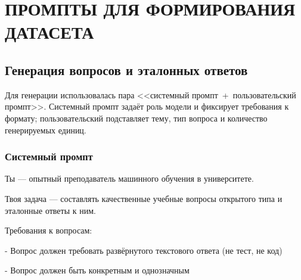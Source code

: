 \chapter{ПРОМПТЫ ДЛЯ ФОРМИРОВАНИЯ ДАТАСЕТА}
\label{app:prompts}
 
 
 
\section{Генерация вопросов и эталонных ответов}
\label{app:prompts:generation}
 
Для генерации использовалась пара <<системный промпт~+~пользовательский
промпт>>. Системный промпт задаёт роль модели и фиксирует требования к
формату; пользовательский подставляет тему, тип вопроса и количество
генерируемых единиц.
 
\subsection{Системный промпт}
 
Ты — опытный преподаватель машинного обучения в университете.
  
\vspace{1em}
Твоя задача — составлять качественные учебные вопросы открытого
типа и эталонные ответы к ним.
   
\vspace{1em}
Требования к вопросам:

- Вопрос должен требовать развёрнутого текстового ответа
  (не тест, не код)

- Вопрос должен быть конкретным и однозначным

